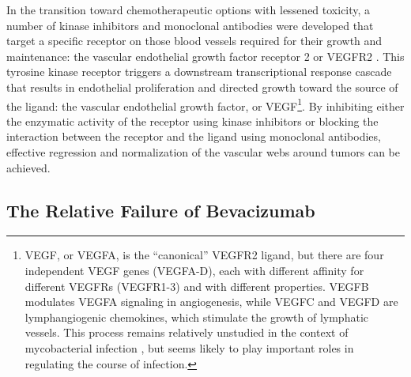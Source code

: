 In the transition toward chemotherapeutic options with lessened toxicity, a number of kinase inhibitors and monoclonal antibodies were developed that target a specific receptor on those blood vessels required for their growth and maintenance: the vascular endothelial growth factor receptor 2 or VEGFR2 \citep{Potente2011, Ranieri2014, Shibuya2011, Welti2013}. This tyrosine kinase receptor triggers a downstream transcriptional response cascade that results in endothelial proliferation and directed growth toward the source of the ligand: the vascular endothelial growth factor, or VEGF\footnote{VEGF, or VEGFA, is the ``canonical'' VEGFR2 ligand, but there are four independent VEGF genes (VEGFA\hyp{}D), each with different affinity for different VEGFRs (VEGFR1\hyp{}3) and with different properties. VEGFB modulates VEGFA signaling in angiogenesis, while VEGFC and VEGFD are lymphangiogenic chemokines, which stimulate the growth of lymphatic vessels. This process remains relatively unstudied in the context of mycobacterial infection \citep{Harding2015}, but seems likely to play important roles in regulating the course of infection.}. By inhibiting either the enzymatic activity of the receptor using kinase inhibitors or blocking the interaction between the receptor and the ligand using monoclonal antibodies, effective regression and normalization of the vascular webs around tumors can be achieved. 

\subsection{The Relative Failure of Bevacizumab}\label{bevacizumab}


